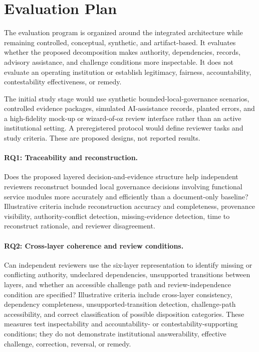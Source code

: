 \documentclass[11pt]{article}
\begin{document}
\section{Evaluation Plan}

The evaluation program is organized around the integrated architecture while
remaining controlled, conceptual, synthetic, and artifact-based. It evaluates
whether the proposed decomposition makes authority, dependencies, records,
advisory assistance, and challenge conditions more inspectable. It does not
evaluate an operating institution or establish legitimacy, fairness,
accountability, contestability effectiveness, or remedy.

The initial study stage would use synthetic bounded-local-governance
scenarios, controlled evidence packages, simulated AI-assistance records,
planted errors, and a high-fidelity mock-up or wizard-of-oz review interface
rather than an active institutional setting. A preregistered protocol would
define reviewer tasks and study criteria. These are proposed designs, not
reported results.

\paragraph{RQ1: Traceability and reconstruction.} Does the proposed layered
decision-and-evidence structure help independent reviewers reconstruct bounded
local governance decisions involving functional service modules more
accurately and efficiently than a document-only baseline? Illustrative
criteria include reconstruction accuracy and completeness, provenance
visibility, authority-conflict detection, missing-evidence detection, time to
reconstruct rationale, and reviewer disagreement.

\paragraph{RQ2: Cross-layer coherence and review conditions.} Can independent
reviewers use the six-layer representation to identify missing or conflicting
authority, undeclared dependencies, unsupported transitions between layers,
and whether an accessible challenge path and review-independence condition are
specified? Illustrative criteria include cross-layer consistency, dependency
completeness, unsupported-transition detection, challenge-path accessibility,
and correct classification of possible disposition categories. These measures
test inspectability and accountability- or contestability-supporting
conditions; they do not demonstrate institutional answerability, effective
challenge, correction, reversal, or remedy.
\end{document}
